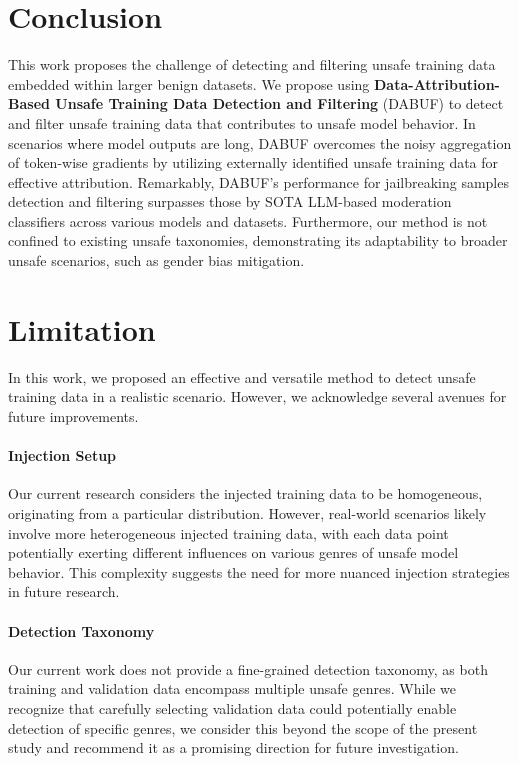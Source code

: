 \documentclass[11pt]{article}
\begin{document}
\section{Conclusion}
This work proposes the challenge of detecting and filtering unsafe training data embedded within larger benign datasets. We propose using \textbf{Data-Attribution-Based Unsafe Training Data Detection and Filtering} (DABUF) to detect and filter unsafe training data that contributes to unsafe model behavior. In scenarios where model outputs are long, DABUF overcomes the noisy aggregation of token-wise gradients by utilizing externally identified unsafe training data for effective attribution. Remarkably, DABUF's performance for jailbreaking samples detection and filtering surpasses those by SOTA LLM-based moderation classifiers across various models and datasets. Furthermore, our method is not confined to existing unsafe taxonomies, demonstrating its adaptability to broader unsafe scenarios, such as gender bias mitigation.

\section*{Limitation}

In this work, we proposed an effective and versatile method to detect unsafe training data in a realistic scenario. However, we acknowledge several avenues for future improvements.

\paragraph{Injection Setup} Our current research considers the injected training data to be homogeneous, originating from a particular distribution. However, real-world scenarios likely involve more heterogeneous injected training data, with each data point potentially exerting different influences on various genres of unsafe model behavior. This complexity suggests the need for more nuanced injection strategies in future research.
\paragraph{Detection Taxonomy}
Our current work does not provide a fine-grained detection taxonomy, as both training and validation data encompass multiple unsafe genres. While we recognize that carefully selecting validation data could potentially enable detection of specific genres, we consider this beyond the scope of the present study and recommend it as a promising direction for future investigation.
\end{document}
